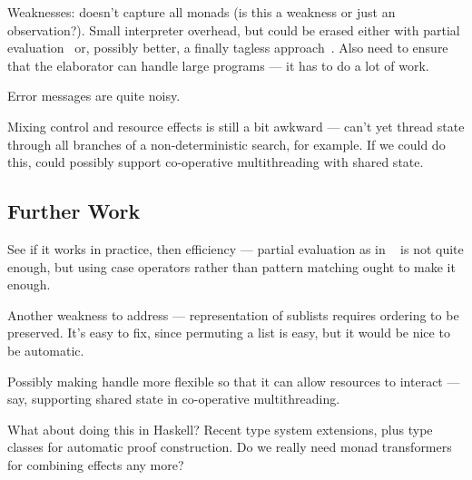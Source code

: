 Weaknesses: doesn't capture all monads (is this a weakness or just an
observation?). Small interpreter overhead, but could be erased either with
partial evaluation~\cite{Brady2010} or, possibly better, a finally
tagless approach~\cite{Carette2009}. Also need to ensure that the elaborator
can handle large programs --- it has to do a lot of work.

Error messages are quite noisy.

Mixing control and resource effects is still a bit awkward --- can't yet
thread state through all branches of a non-deterministic search, for example.
If we could do this, could possibly support co-operative multithreading with
shared state.

\subsection{Further Work}

See if it works in practice, then efficiency --- partial evaluation as in
~\cite{Brady2010} is not quite enough, but using case operators rather
than pattern matching ought to make it enough.

Another weakness to address --- representation of sublists requires ordering
to be preserved. It's easy to fix, since permuting a list is easy, but it
would be nice to be automatic.

Possibly making handle more flexible so that it can allow resources to interact
--- say, supporting shared state in co-operative multithreading.

What about doing this in Haskell? Recent type system extensions, plus type
classes for automatic proof construction. Do we really need monad transformers
for combining effects any more?

